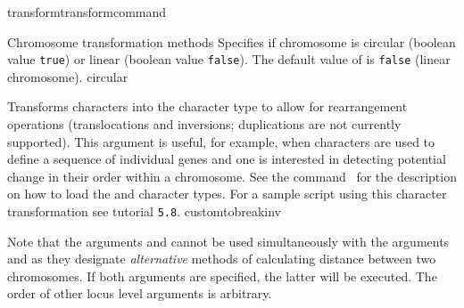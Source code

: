 \begin{command}{transform}{transformcommand}
\begin{arguments}
\begin{argumentgroup}{Chromosome transformation methods}
                {Specifies if chromosome is circular (boolean value
                \texttt{true}) or linear (boolean value \texttt{false}). The
                default value of  is \texttt{false}
                (linear chromosome).}
                {circular}
             
                {Transforms  characters into the  character type to allow for 
                rearrangement operations (translocations and inversions; duplications are not currently supported). This argument is useful, for 
                example, when  characters are used to define a sequence of individual genes and one is 
                interested in detecting potential change in their order within a chromosome. 
                See the command~ for the description on how to load the  and  character types. }%
                For a sample script using this character transformation see tutorial \texttt{5.8}.
                {customtobreakinv}
             
            \begin{statement}
  		        Note that the arguments  and
                 cannot be used simultaneously
                with the arguments  and
                 as they designate
                \emph{alternative} methods of calculating distance between two
                chromosomes.  If both arguments are specified, the latter will
                be executed. The order of other locus level arguments is
                arbitrary.
		    \end{statement}
		

\end{argumentgroup}
\end{arguments}
\end{command}
